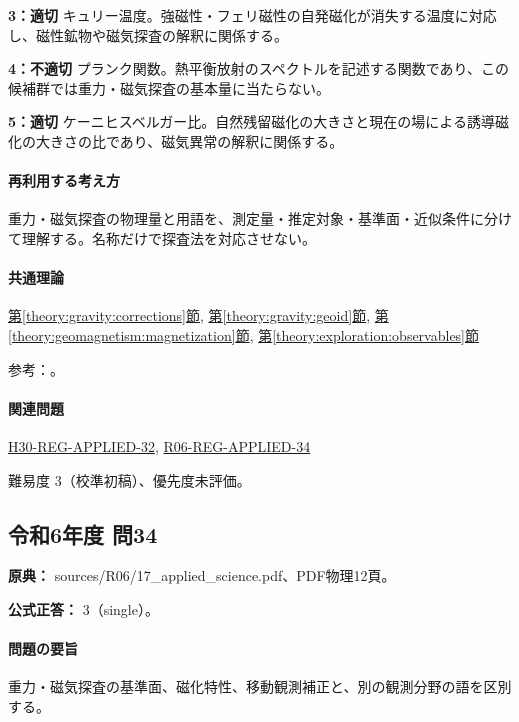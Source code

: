 \noindent\textbf{3：適切} キュリー温度。強磁性・フェリ磁性の自発磁化が消失する温度に対応し、磁性鉱物や磁気探査の解釈に関係する。\par

\noindent\textbf{4：不適切} プランク関数。熱平衡放射のスペクトルを記述する関数であり、この候補群では重力・磁気探査の基本量に当たらない。\par

\noindent\textbf{5：適切} ケーニヒスベルガー比。自然残留磁化の大きさと現在の場による誘導磁化の大きさの比であり、磁気異常の解釈に関係する。\par

\paragraph{再利用する考え方} 重力・磁気探査の物理量と用語を、測定量・推定対象・基準面・近似条件に分けて理解する。名称だけで探査法を対応させない。

\paragraph{共通理論} \hyperref[theory:gravity:corrections]{第\ref*{theory:gravity:corrections}節}, \hyperref[theory:gravity:geoid]{第\ref*{theory:gravity:geoid}節}, \hyperref[theory:geomagnetism:magnetization]{第\ref*{theory:geomagnetism:magnetization}節}, \hyperref[theory:exploration:observables]{第\ref*{theory:exploration:observables}節}

\par 参考：\cite{gsi_gravity_definitions,kanaya_okuma2011}。

\paragraph{関連問題} \hyperref[q:h30-reg-applied-32]{H30-REG-APPLIED-32}, \hyperref[q:r06-reg-applied-34]{R06-REG-APPLIED-34}

\par 難易度 3（校準初稿）、優先度未評価。

\subsection{令和6年度 問34}
\label{q:r06-reg-applied-34}

\noindent\textbf{原典：} sources/R06/17\_applied\_science.pdf、PDF物理12頁。

\textbf{公式正答：} 3（single）。

\paragraph{問題の要旨} 重力・磁気探査の基準面、磁化特性、移動観測補正と、別の観測分野の語を区別する。

